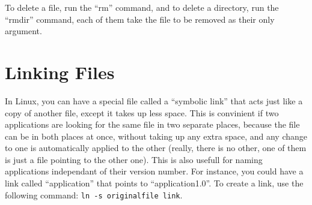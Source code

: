 \documentclass[12pt,letterpaper,oneside, openany]{book} \usepackage[latin1] {inputenc}
\begin{document}
To delete a file, run the ``rm'' command, and to delete a directory, run the ``rmdir'' command, each of them take the file to be removed as their only argument.

\section{Linking Files}

In Linux, you can have a special file called a ``symbolic link'' that acts just like a copy of another file, except it takes up less space.  This is convinient if two applications are looking for the same file in two separate places, because the file can be in both places at once, without taking up any extra space, and any change to one is automatically applied to the other (really, there is no other, one of them is just a file pointing to the other one).  This is also usefull for naming applications independant of their version number.  For instance, you could have a link called ``application'' that points to ``application1.0''.  To create a link, use the following command: \verb+ln -s originalfile link+.
\end{document}
